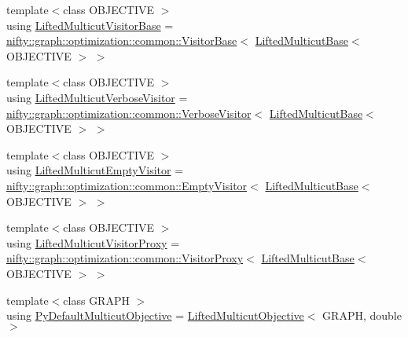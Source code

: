 \begin{DoxyCompactItemize}
\item 
{\footnotesize template$<$class O\+B\+J\+E\+C\+T\+I\+V\+E $>$ }\\using \hyperlink{namespacenifty_1_1graph_1_1optimization_1_1lifted__multicut_a7fba9b4f2086d28c7448955f4af4a0de}{Lifted\+Multicut\+Visitor\+Base} = \hyperlink{classnifty_1_1graph_1_1optimization_1_1common_1_1VisitorBase}{nifty\+::graph\+::optimization\+::common\+::\+Visitor\+Base}$<$ \hyperlink{classnifty_1_1graph_1_1optimization_1_1lifted__multicut_1_1LiftedMulticutBase}{Lifted\+Multicut\+Base}$<$ O\+B\+J\+E\+C\+T\+I\+V\+E $>$ $>$
\item 
{\footnotesize template$<$class O\+B\+J\+E\+C\+T\+I\+V\+E $>$ }\\using \hyperlink{namespacenifty_1_1graph_1_1optimization_1_1lifted__multicut_a5bff2c59860c848ec87e90add5a70d47}{Lifted\+Multicut\+Verbose\+Visitor} = \hyperlink{classnifty_1_1graph_1_1optimization_1_1common_1_1VerboseVisitor}{nifty\+::graph\+::optimization\+::common\+::\+Verbose\+Visitor}$<$ \hyperlink{classnifty_1_1graph_1_1optimization_1_1lifted__multicut_1_1LiftedMulticutBase}{Lifted\+Multicut\+Base}$<$ O\+B\+J\+E\+C\+T\+I\+V\+E $>$ $>$
\item 
{\footnotesize template$<$class O\+B\+J\+E\+C\+T\+I\+V\+E $>$ }\\using \hyperlink{namespacenifty_1_1graph_1_1optimization_1_1lifted__multicut_a344995f0dd906c91911dcf3bc4b53397}{Lifted\+Multicut\+Empty\+Visitor} = \hyperlink{classnifty_1_1graph_1_1optimization_1_1common_1_1EmptyVisitor}{nifty\+::graph\+::optimization\+::common\+::\+Empty\+Visitor}$<$ \hyperlink{classnifty_1_1graph_1_1optimization_1_1lifted__multicut_1_1LiftedMulticutBase}{Lifted\+Multicut\+Base}$<$ O\+B\+J\+E\+C\+T\+I\+V\+E $>$ $>$
\item 
{\footnotesize template$<$class O\+B\+J\+E\+C\+T\+I\+V\+E $>$ }\\using \hyperlink{namespacenifty_1_1graph_1_1optimization_1_1lifted__multicut_a9dd0bd3a8572b292340fd5914c7ce0f4}{Lifted\+Multicut\+Visitor\+Proxy} = \hyperlink{classnifty_1_1graph_1_1optimization_1_1common_1_1VisitorProxy}{nifty\+::graph\+::optimization\+::common\+::\+Visitor\+Proxy}$<$ \hyperlink{classnifty_1_1graph_1_1optimization_1_1lifted__multicut_1_1LiftedMulticutBase}{Lifted\+Multicut\+Base}$<$ O\+B\+J\+E\+C\+T\+I\+V\+E $>$ $>$
\item 
{\footnotesize template$<$class G\+R\+A\+P\+H $>$ }\\using \hyperlink{namespacenifty_1_1graph_1_1optimization_1_1lifted__multicut_a462aa786d8b2342b9d580f19f184f5eb}{Py\+Default\+Multicut\+Objective} = \hyperlink{classnifty_1_1graph_1_1optimization_1_1lifted__multicut_1_1LiftedMulticutObjective}{Lifted\+Multicut\+Objective}$<$ G\+R\+A\+P\+H, double $>$
\end{DoxyCompactItemize}
